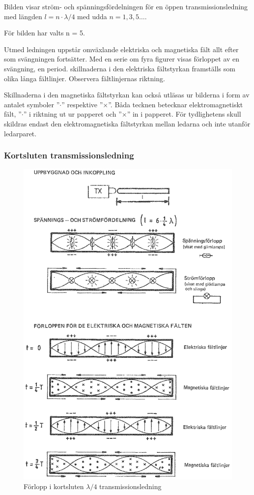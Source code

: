 Bilden visar ström- och spänningsfördelningen för en öppen
transmissionsledning med längden \(l = n\cdot\lambda/4\) med udda \(n
= 1, 3, 5 \dots\).

För bilden har valts n = 5.

Utmed ledningen uppstår omväxlande elektriska och magnetiska fält allt
efter som svängningen fortsätter. Med en serie om fyra figurer visas
förloppet av en svängning, en period. skillnaderna i den elektriska
fältstyrkan framställs som olika långa fältlinjer.  Observera
fältlinjernas riktning.

Skillnaderna i den magnetiska fältstyrkan kan också utläsas ur
bilderna i form av antalet symboler ''\(\cdot\)'' respektive
''\(\times\)''. Båda tecknen betecknar elektromagnetiskt fält, ''\(\cdot\)'' i
riktning ut ur papperet och ''\(\times\)'' in i papperet. För
tydlighetens skull skildras endast den elektromagnetiska fältstyrkan
mellan ledarna och inte utanför ledarparet.

\subsubsection{Kortsluten transmissionsledning}


\begin{figure}
  \includegraphics[width=\textwidth]{images/cropped_pdfs/bild_2_6-34.pdf}
  \caption{Förlopp i kortsluten $\lambda/4$ transmissionsledning}
  \label{fig:bildII6-34}
\end{figure}

